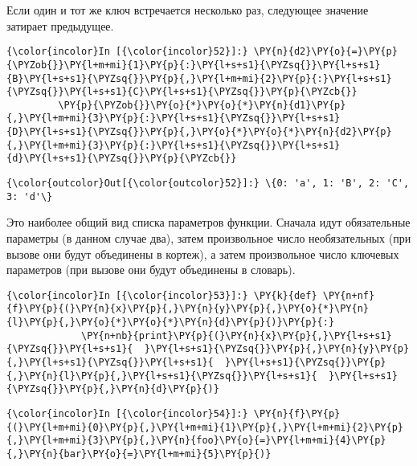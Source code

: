     Если один и тот же ключ встречается несколько раз, следующее значение
затирает предыдущее.

    \begin{Verbatim}[commandchars=\\\{\}]
{\color{incolor}In [{\color{incolor}52}]:} \PY{n}{d2}\PY{o}{=}\PY{p}{\PYZob{}}\PY{l+m+mi}{1}\PY{p}{:}\PY{l+s+s1}{\PYZsq{}}\PY{l+s+s1}{B}\PY{l+s+s1}{\PYZsq{}}\PY{p}{,}\PY{l+m+mi}{2}\PY{p}{:}\PY{l+s+s1}{\PYZsq{}}\PY{l+s+s1}{C}\PY{l+s+s1}{\PYZsq{}}\PY{p}{\PYZcb{}}
         \PY{p}{\PYZob{}}\PY{o}{*}\PY{o}{*}\PY{n}{d1}\PY{p}{,}\PY{l+m+mi}{3}\PY{p}{:}\PY{l+s+s1}{\PYZsq{}}\PY{l+s+s1}{D}\PY{l+s+s1}{\PYZsq{}}\PY{p}{,}\PY{o}{*}\PY{o}{*}\PY{n}{d2}\PY{p}{,}\PY{l+m+mi}{3}\PY{p}{:}\PY{l+s+s1}{\PYZsq{}}\PY{l+s+s1}{d}\PY{l+s+s1}{\PYZsq{}}\PY{p}{\PYZcb{}}
\end{Verbatim}

            \begin{Verbatim}[commandchars=\\\{\}]
{\color{outcolor}Out[{\color{outcolor}52}]:} \{0: 'a', 1: 'B', 2: 'C', 3: 'd'\}
\end{Verbatim}
        
    Это наиболее общий вид списка параметров функции. Сначала идут
обязательные параметры (в данном случае два), затем произвольное число
необязательных (при вызове они будут объединены в кортеж), а затем
произвольное число ключевых параметров (при вызове они будут объединены
в словарь).

    \begin{Verbatim}[commandchars=\\\{\}]
{\color{incolor}In [{\color{incolor}53}]:} \PY{k}{def} \PY{n+nf}{f}\PY{p}{(}\PY{n}{x}\PY{p}{,}\PY{n}{y}\PY{p}{,}\PY{o}{*}\PY{n}{l}\PY{p}{,}\PY{o}{*}\PY{o}{*}\PY{n}{d}\PY{p}{)}\PY{p}{:}
             \PY{n+nb}{print}\PY{p}{(}\PY{n}{x}\PY{p}{,}\PY{l+s+s1}{\PYZsq{}}\PY{l+s+s1}{  }\PY{l+s+s1}{\PYZsq{}}\PY{p}{,}\PY{n}{y}\PY{p}{,}\PY{l+s+s1}{\PYZsq{}}\PY{l+s+s1}{  }\PY{l+s+s1}{\PYZsq{}}\PY{p}{,}\PY{n}{l}\PY{p}{,}\PY{l+s+s1}{\PYZsq{}}\PY{l+s+s1}{  }\PY{l+s+s1}{\PYZsq{}}\PY{p}{,}\PY{n}{d}\PY{p}{)}
\end{Verbatim}

    \begin{Verbatim}[commandchars=\\\{\}]
{\color{incolor}In [{\color{incolor}54}]:} \PY{n}{f}\PY{p}{(}\PY{l+m+mi}{0}\PY{p}{,}\PY{l+m+mi}{1}\PY{p}{,}\PY{l+m+mi}{2}\PY{p}{,}\PY{l+m+mi}{3}\PY{p}{,}\PY{n}{foo}\PY{o}{=}\PY{l+m+mi}{4}\PY{p}{,}\PY{n}{bar}\PY{o}{=}\PY{l+m+mi}{5}\PY{p}{)}
\end{Verbatim}

